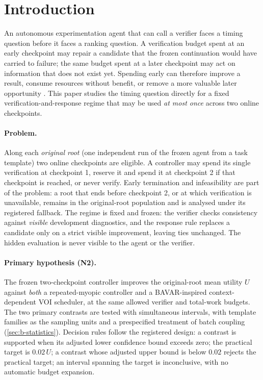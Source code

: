 \section{Introduction}
\label{sec:b-introduction}

An autonomous experimentation agent that can call a verifier faces a timing
question before it faces a ranking question.  A verification budget spent at an
early checkpoint may repair a candidate that the frozen continuation would have
carried to failure; the same budget spent at a later checkpoint may act on
information that does not exist yet.  Spending early can therefore improve a
result, consume resources without benefit, or remove a more valuable later
opportunity \citep{calibrationnotcontrol2026,harnessr12026}.  This paper studies
the timing question directly for a fixed verification-and-response regime that
may be used \emph{at most once} across two online checkpoints.

\paragraph{Problem.}
Along each \emph{original root} (one independent run of the frozen agent from a
task template) two online checkpoints are eligible.  A controller may spend its
single verification at checkpoint 1, reserve it and spend it at checkpoint 2 if
that checkpoint is reached, or never verify.  Early termination and
infeasibility are part of the problem: a root that ends before checkpoint 2, or
at which verification is unavailable, remains in the original-root population
and is analysed under its registered fallback.  The regime is fixed and frozen:
the verifier checks consistency against \emph{visible} development diagnostics,
and the response rule replaces a candidate only on a strict visible improvement,
leaving ties unchanged.  The hidden evaluation is never visible to the agent or
the verifier.

\paragraph{Primary hypothesis (N2).}
The frozen two-checkpoint controller improves the original-root mean utility $U$
against \emph{both} a repeated-myopic controller and a BAVAR-inspired
context-dependent VOI scheduler, at the same allowed verifier and total-work
budgets.  The two
primary contrasts are tested with simultaneous intervals, with template families
as the sampling units and a prespecified treatment of batch coupling
(\cref{sec:b-statistics}).  Decision rules follow the registered design: a
contrast is supported when its adjusted lower confidence bound exceeds zero; the
practical target is $0.02\,U$; a contrast whose adjusted upper bound is below
$0.02$ rejects the practical target; an interval spanning the target is
inconclusive, with no automatic budget expansion.

